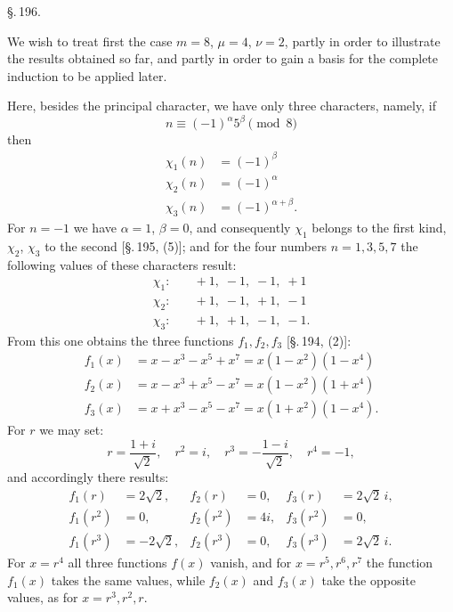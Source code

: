 
\begin{center}
\S.\,196.

\end{center}

We wish to treat first the case $m = 8$, $\mu = 4$, $\nu = 2$, partly in order to illustrate the results obtained so far, and partly in order to gain a basis for the complete induction to be applied later.

Here, besides the principal character, we have only three characters, namely, if
\[
n \equiv (-1)^\alpha 5^\beta \pmod{8}
\]
then
\[
\begin{aligned}
\chi_1(n) & = (-1)^\beta \\
\chi_2(n) & = (-1)^\alpha \\
\chi_3(n) & = (-1)^{\alpha+\beta}.
\end{aligned}
\]
For $n = -1$ we have $\alpha = 1$, $\beta = 0$, and consequently $\chi_1$ belongs to the first kind, $\chi_2$, $\chi_3$ to the second [\S.\,195, (5)]; and for the four numbers $n = 1, 3, 5, 7$ the following values of these characters result:
\[
\begin{aligned}
\chi_1: & \quad +1, \; -1, \; -1, \; +1 \\
\chi_2: & \quad +1, \; -1, \; +1, \; -1 \\
\chi_3: & \quad +1, \; +1, \; -1, \; -1.
\end{aligned}
\]
From this one obtains the three functions $f_1, f_2, f_3$ [\S.\,194, (2)]:
\[
\begin{aligned}
f_1(x) & = x - x^3 - x^5 + x^7 = x(1-x^2)(1-x^4) \\
f_2(x) & = x - x^3 + x^5 - x^7 = x(1-x^2)(1+x^4) \\
f_3(x) & = x + x^3 - x^5 - x^7 = x(1+x^2)(1-x^4).
\end{aligned}
\]
For $r$ we may set:
\[
r = \frac{1+i}{\sqrt{2}}, \quad r^2 = i, \quad r^3 = -\frac{1-i}{\sqrt{2}}, \quad r^4 = -1,
\]
and accordingly there results:
\[
\begin{aligned}
f_1(r) & = 2\sqrt{2}, & f_2(r) & = 0, & f_3(r) & = 2\sqrt{2}\,i, \\
f_1(r^2) & = 0, & f_2(r^2) & = 4i, & f_3(r^2) & = 0, \\
f_1(r^3) & = -2\sqrt{2}, & f_2(r^3) & = 0, & f_3(r^3) & = 2\sqrt{2}\,i.
\end{aligned}
\]
For $x = r^4$ all three functions $f(x)$ vanish, and for $x = r^5, r^6, r^7$ the function $f_1(x)$ takes the same values, while $f_2(x)$ and $f_3(x)$ take the opposite values, as for $x = r^3, r^2, r$.
